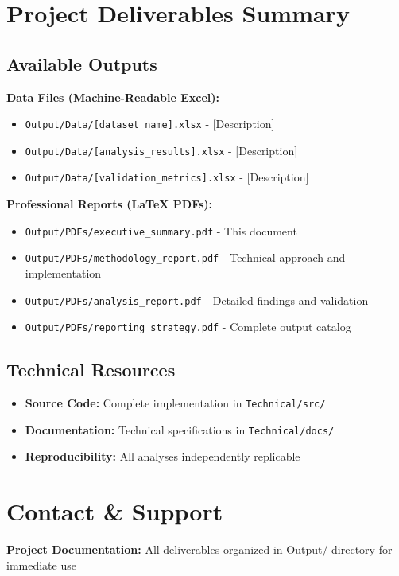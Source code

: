 \documentclass[11pt,letterpaper]{article}
\begin{document}
\section{Project Deliverables Summary}

\subsection{Available Outputs}
\textbf{Data Files (Machine-Readable Excel):}
\begin{itemize}
    \item \texttt{Output/Data/[dataset\_name].xlsx} - [Description]
    \item \texttt{Output/Data/[analysis\_results].xlsx} - [Description]
    \item \texttt{Output/Data/[validation\_metrics].xlsx} - [Description]
\end{itemize}

\textbf{Professional Reports (LaTeX PDFs):}
\begin{itemize}
    \item \texttt{Output/PDFs/executive\_summary.pdf} - This document
    \item \texttt{Output/PDFs/methodology\_report.pdf} - Technical approach and implementation
    \item \texttt{Output/PDFs/analysis\_report.pdf} - Detailed findings and validation
    \item \texttt{Output/PDFs/reporting\_strategy.pdf} - Complete output catalog
\end{itemize}

\subsection{Technical Resources}
\begin{itemize}
    \item \textbf{Source Code:} Complete implementation in \texttt{Technical/src/}
    \item \textbf{Documentation:} Technical specifications in \texttt{Technical/docs/}
    \item \textbf{Reproducibility:} All analyses independently replicable
\end{itemize}

\section{Contact \& Support}

\textbf{Project Documentation:} All deliverables organized in Output/ directory for immediate use
\end{document}

